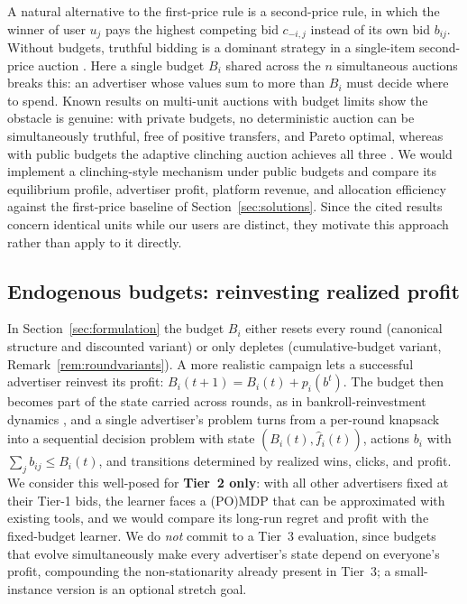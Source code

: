 \documentclass{article}
\theoremstyle{definition}
\theoremstyle{remark}
\begin{document}
A natural alternative to the first-price rule is a second-price rule, in which the
winner of user $u_j$ pays the highest competing bid $c_{-i,j}$ instead of its own bid
$b_{ij}$. Without budgets, truthful bidding is a dominant strategy in a single-item
second-price auction \citep{vickrey1961counterspeculation}. Here a single budget $B_i$
shared across the $n$ simultaneous auctions breaks this: an advertiser whose values
sum to more than $B_i$ must decide where to spend. Known results on multi-unit
auctions with budget limits show the obstacle is genuine: with private budgets, no
deterministic auction can be simultaneously truthful, free of positive transfers, and
Pareto optimal, whereas with public budgets the adaptive clinching auction achieves
all three \citep{dobzinski2012multiunit,ausubel2004efficient}. We would implement a
clinching-style mechanism under public budgets and compare its equilibrium profile,
advertiser profit, platform revenue, and allocation efficiency against the first-price
baseline of Section~\ref{sec:solutions}. Since the cited results concern identical
units while our users are distinct, they motivate this approach rather than apply to
it directly.

\subsection{Endogenous budgets: reinvesting realized profit}
\label{sec:future-endogenous}

In Section~\ref{sec:formulation} the budget $B_i$ either resets every round
(canonical structure and discounted variant) or only depletes (cumulative-budget
variant, Remark~\ref{rem:roundvariants}). A more realistic campaign lets a successful
advertiser reinvest its profit: $B_i(t+1)=B_i(t)+p_i(b^t)$. The budget then becomes part
of the state carried across rounds, as in bankroll-reinvestment dynamics
\citep{kelly1956new}, and a single advertiser's problem turns from a per-round
knapsack into a sequential decision problem with state $(B_i(t),\hat f_i(t))$, actions
$b_i$ with $\sum_j b_{ij}\le B_i(t)$, and transitions determined by realized wins,
clicks, and profit. We consider this well-posed for \textbf{Tier~2 only}: with all other
advertisers fixed at their Tier-1 bids, the learner faces a (PO)MDP that can be
approximated with existing tools, and we would compare its long-run regret and profit
with the fixed-budget learner. We do \emph{not} commit to a Tier~3 evaluation, since
budgets that evolve simultaneously make every advertiser's state depend on everyone's
profit, compounding the non-stationarity already present in Tier~3; a small-instance
version is an optional stretch goal.
\end{document}
